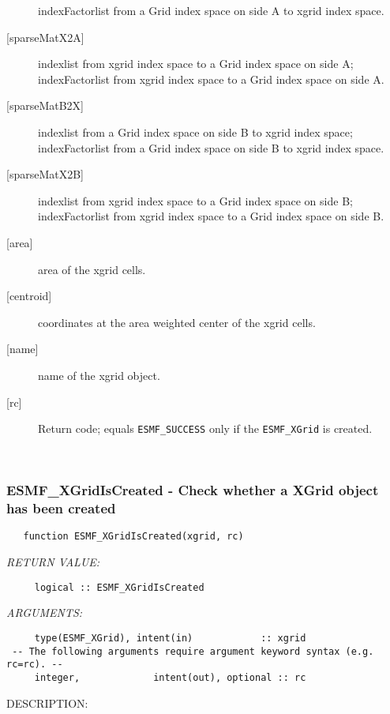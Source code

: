 \begin{description}
             indexFactorlist from a Grid index space on side A to xgrid index space.
       \item [{[sparseMatX2A]}]
             indexlist from xgrid index space to a Grid index space on side A;
             indexFactorlist from xgrid index space to a Grid index space on side A.
       \item [{[sparseMatB2X]}]
             indexlist from a Grid index space on side B to xgrid index space;
             indexFactorlist from a Grid index space on side B to xgrid index space.
       \item [{[sparseMatX2B]}]
             indexlist from xgrid index space to a Grid index space on side B;
             indexFactorlist from xgrid index space to a Grid index space on side B.
       \item [{[area]}]
             area of the xgrid cells.
       \item [{[centroid]}]
             coordinates at the area weighted center of the xgrid cells.
       \item [{[name]}]
             name of the xgrid object.
       \item [{[rc]}]
             Return code; equals {\tt ESMF\_SUCCESS} only if the {\tt ESMF\_XGrid} 
             is created.
       \end{description}
   
 
\mbox{}\hrulefill\ 
 
\subsubsection [ESMF\_XGridIsCreated] {ESMF\_XGridIsCreated - Check whether a XGrid object has been created}


 
\begin{verbatim}   function ESMF_XGridIsCreated(xgrid, rc)\end{verbatim}{\em RETURN VALUE:}
\begin{verbatim}     logical :: ESMF_XGridIsCreated\end{verbatim}{\em ARGUMENTS:}
\begin{verbatim}     type(ESMF_XGrid), intent(in)            :: xgrid
 -- The following arguments require argument keyword syntax (e.g. rc=rc). --
     integer,             intent(out), optional :: rc
 \end{verbatim}
{\sf DESCRIPTION:\\ }


